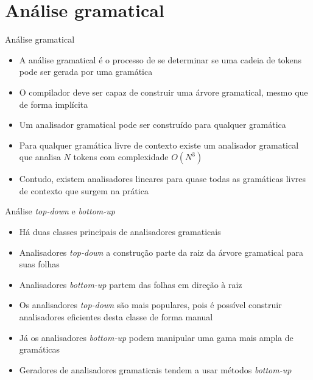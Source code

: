 \section{Análise gramatical}

\begin{frame}[fragile]{Análise gramatical}

    \begin{itemize}
        \item A análise gramatical é o processo de se determinar se uma cadeia de tokens pode ser gerada por uma gramática

        \item O compilador deve ser capaz de construir uma árvore gramatical, mesmo que de forma implícita

        \item Um analisador gramatical pode ser construído para qualquer gramática

        \item Para qualquer gramática livre de contexto existe um analisador gramatical que analisa $N$ tokens com complexidade $O(N^3)$

        \item Contudo, existem analisadores lineares para quase todas as gramáticas livres de contexto que surgem na prática
    \end{itemize}

\end{frame}

\begin{frame}[fragile]{Análise {\it top-down} e {\it bottom-up}}

    \begin{itemize}
        \item Há duas classes principais de analisadores gramaticais

        \item Analisadores {\it top-down} a construção parte da raiz da árvore gramatical para suas folhas

        \item Analisadores {\it bottom-up} partem das folhas em direção à raiz

        \item Os analisadores \textit{top-down} são mais populares, pois é possível construir analisadores eficientes desta classe de forma manual

        \item Já os analisadores \textit{bottom-up} podem manipular uma gama mais ampla de gramáticas

        \item Geradores de analisadores gramaticais tendem a usar métodos \textit{bottom-up}
    \end{itemize}

\end{frame}

